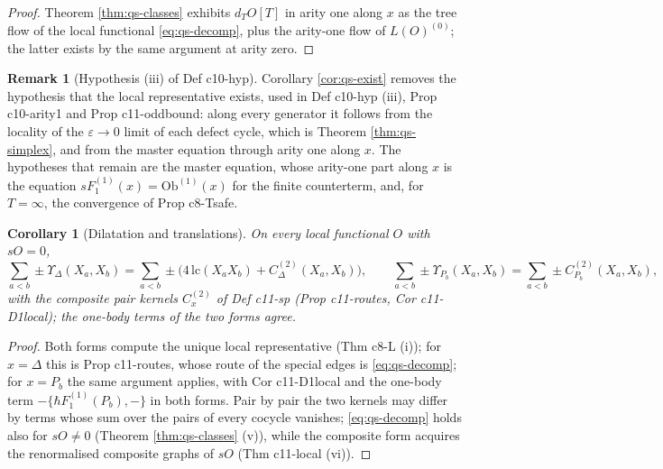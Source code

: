\documentclass[11pt]{article}
\numberwithin{equation}{section}
\theoremstyle{plain}
\newtheorem{corollary}[theorem]{Corollary}
\theoremstyle{definition}
\newtheorem{remark}[theorem]{Remark}
\begin{document}
\begin{proof}
Theorem \ref{thm:qs-classes} exhibits $d_TO[T]$ in arity one along $x$ as the tree flow of the local functional \eqref{eq:qs-decomp}, plus the arity-one flow of $L(O)^{(0)}$; the latter exists by the same argument at arity zero.
\end{proof}

\begin{remark}[Hypothesis (iii) of Def c10-hyp]
\label{rem:qs-hyp}
Corollary \ref{cor:qs-exist} removes the hypothesis that the local representative exists, used in Def c10-hyp (iii), Prop c10-arity1 and Prop c11-oddbound: along every generator it follows from the locality of the $\varepsilon\to0$ limit of each defect cycle, which is Theorem \ref{thm:qs-simplex}, and from the master equation through arity one along $x$. The hypotheses that remain are the master equation, whose arity-one part along $x$ is the equation $sF_1^{(1)}(x)=\mathrm{Ob}^{(1)}(x)$ for the finite counterterm, and, for $T=\infty$, the convergence of Prop c8-Tsafe.
\end{remark}

\begin{corollary}[Dilatation and translations]
\label{cor:qs-DP}
On every local functional $O$ with $sO=0$,
\[
\sum_{a<b}\pm\Upsilon_\Delta(X_a,X_b)=\sum_{a<b}\pm\big(4\,\mathrm{lc}(X_aX_b)+C^{(2)}_\Delta(X_a,X_b)\big),\qquad \sum_{a<b}\pm\Upsilon_{P_b}(X_a,X_b)=\sum_{a<b}\pm C^{(2)}_{P_b}(X_a,X_b),
\] with the composite pair kernels $C^{(2)}_x$ of Def c11-sp (Prop c11-routes, Cor c11-D1local); the one-body terms of the two forms agree.
\end{corollary}

\begin{proof}
Both forms compute the unique local representative (Thm c8-L (i)); for $x=\Delta$ this is Prop c11-routes, whose route of the special edges is \eqref{eq:qs-decomp}; for $x=P_b$ the same argument applies, with Cor c11-D1local and the one-body term $-\{\hbar F_1^{(1)}(P_b),-\}$ in both forms. Pair by pair the two kernels may differ by terms whose sum over the pairs of every cocycle vanishes; \eqref{eq:qs-decomp} holds also for $sO\neq0$ (Theorem \ref{thm:qs-classes} (v)), while the composite form acquires the renormalised composite graphs of $sO$ (Thm c11-local (vi)).
\end{proof}
\end{document}
